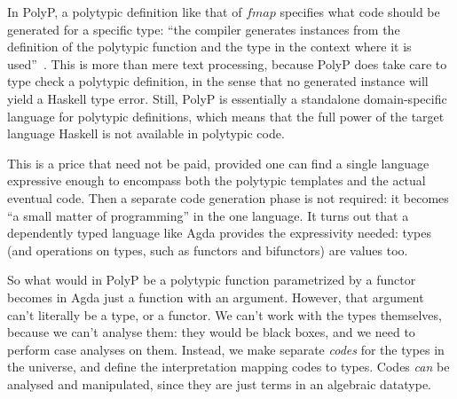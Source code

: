 \documentclass[fleqn,runningheads]{llncs}
\begin{document}
In PolyP, a polytypic definition like that of $\mathit{fmap}$ specifies what code should be generated for a specific type: ``the compiler generates instances from the definition of the polytypic function and the type in the context where it is used''~\cite{Jansson&Jeuring97:Polytypic}. This is more than mere text processing, because PolyP does take care to type check a polytypic definition, in the sense that no generated instance will yield a Haskell type error. Still, PolyP is essentially a standalone domain-specific language for polytypic definitions, which means that the full power of the target language Haskell is not available in polytypic code.

This is a price that need not be paid, provided one can find a single language expressive enough to encompass both the polytypic templates and the actual eventual code. Then a separate code generation phase is not required: it becomes ``a small matter of programming'' in the one language.
It turns out that a dependently typed language like Agda \cite{norell2007towards} provides the expressivity needed: types (and operations on types, such as functors and bifunctors) are values too.

So what would in PolyP be a polytypic function parametrized by a functor becomes in Agda just a function with an argument. However, that argument can't literally be a type, or a functor. We can't work with the types themselves, because we can't analyse them: they would be black boxes, and we need to perform case analyses on them. Instead, we make separate \emph{codes} for the types in the universe, and define the interpretation mapping codes to types. Codes \emph{can} be analysed and manipulated, since they are just terms in an algebraic datatype.
\end{document}
